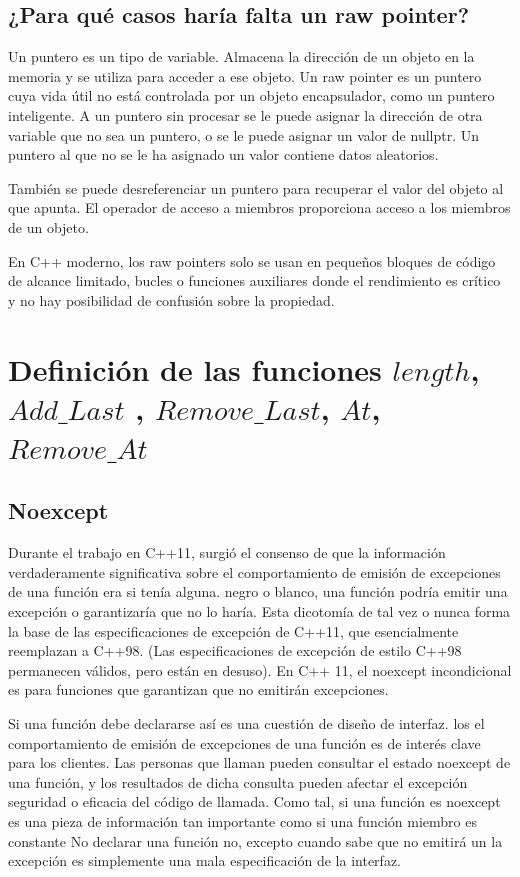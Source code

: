 \documentclass[10pt]{article}
\begin{document}
\subsection{¿Para qué casos haría falta un raw pointer?}

Un puntero es un tipo de variable. Almacena la dirección de un objeto en la memoria y se utiliza para acceder a ese objeto. Un raw pointer es un puntero cuya vida útil no está controlada por un objeto encapsulador, como un puntero inteligente. A un puntero sin procesar se le puede asignar la dirección de otra variable que no sea un puntero, o se le puede asignar un valor de nullptr. Un puntero al que no se le ha asignado un valor contiene datos aleatorios.

También se puede desreferenciar un puntero para recuperar el valor del objeto al que apunta. El operador de acceso a miembros proporciona acceso a los miembros de un objeto.

En C++ moderno, los raw pointers solo se usan en pequeños bloques de código de alcance limitado, bucles o funciones auxiliares donde el rendimiento es crítico y no hay posibilidad de confusión sobre la propiedad.

\vspace{2em}
\section{Definici\'on de las funciones $ length $, $ Add\_Last $ , $ Remove\_Last $, $ At $, $ Remove\_At $}

\subsection{Noexcept}

Durante el trabajo en C++11, surgió el consenso de que la información verdaderamente significativa
sobre el comportamiento de emisión de excepciones de una función era si tenía alguna. negro o
blanco, una función podría emitir una excepción o garantizaría que no lo haría.
Esta dicotomía de tal vez o nunca forma la base de las especificaciones de excepción de C++11,
que esencialmente reemplazan a C++98. (Las especificaciones de excepción de estilo C++98 permanecen
válidos, pero están en desuso). En C++ 11, el noexcept incondicional es para funciones
que garantizan que no emitirán excepciones.

Si una función debe declararse así es una cuestión de diseño de interfaz. los
el comportamiento de emisión de excepciones de una función es de interés clave para los clientes. Las personas que llaman pueden
consultar el estado noexcept de una función, y los resultados de dicha consulta pueden afectar el
excepción seguridad o eficacia del código de llamada. Como tal, si una función es
noexcept es una pieza de información tan importante como si una función miembro es
constante No declarar una función no, excepto cuando sabe que no emitirá un
la excepción es simplemente una mala especificación de la interfaz.
\end{document}
